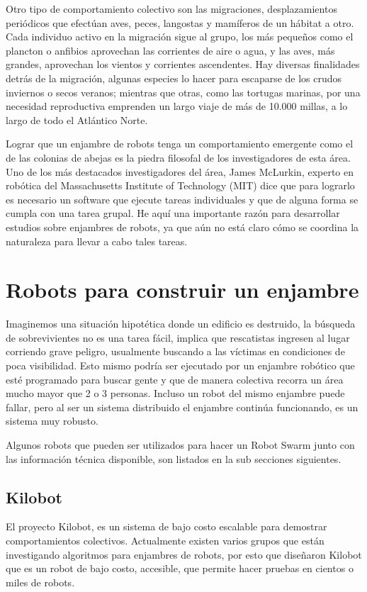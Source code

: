 Otro tipo de comportamiento colectivo son las migraciones, desplazamientos periódicos que efectúan aves, peces, langostas y mamíferos de un hábitat a otro. Cada individuo activo en la migración sigue al grupo, los más pequeños como el plancton o anfibios aprovechan las corrientes de aire o agua, y las aves, más grandes, aprovechan los vientos y corrientes ascendentes. Hay diversas finalidades detrás de la migración, algunas especies lo hacer para escaparse de los crudos inviernos o secos veranos; mientras que otras, como las tortugas marinas, por una necesidad reproductiva emprenden un largo viaje de más de 10.000 millas, a lo largo de todo el Atlántico Norte.

Lograr que un enjambre de robots tenga un comportamiento emergente como el de las colonias de abejas es la piedra filosofal de los investigadores de esta área. Uno de los más destacados investigadores del área, James McLurkin, experto en robótica del Massachusetts Institute of Technology (MIT) dice que para lograrlo es necesario un software que ejecute tareas individuales y     que de alguna forma se cumpla con una tarea grupal. He aquí una importante razón para desarrollar estudios sobre enjambres de robots, ya que aún no está claro cómo se coordina la naturaleza para llevar a cabo tales tareas.

\section{Robots para construir un enjambre}

Imaginemos una situación hipotética donde un edificio es destruido, la búsqueda de sobrevivientes no es una tarea fácil, implica que rescatistas ingresen al lugar corriendo grave peligro, usualmente buscando a las víctimas en condiciones de poca visibilidad. Esto mismo podría ser ejecutado por un enjambre robótico que esté programado para buscar gente y que de manera colectiva recorra un área mucho mayor que 2 o 3 personas. Incluso un robot del mismo enjambre puede fallar, pero al ser un sistema distribuido el enjambre continúa funcionando, es un sistema muy robusto.

Algunos robots que pueden ser utilizados para hacer un Robot Swarm junto con las información técnica disponible, son listados en la sub secciones siguientes.

\subsection{Kilobot}
El proyecto Kilobot, es un sistema de bajo costo escalable para demostrar comportamientos colectivos. Actualmente existen varios grupos que están investigando algoritmos para enjambres de robots, por esto que diseñaron Kilobot que es un robot de bajo costo, accesible,  que permite hacer pruebas en cientos o miles de robots.

